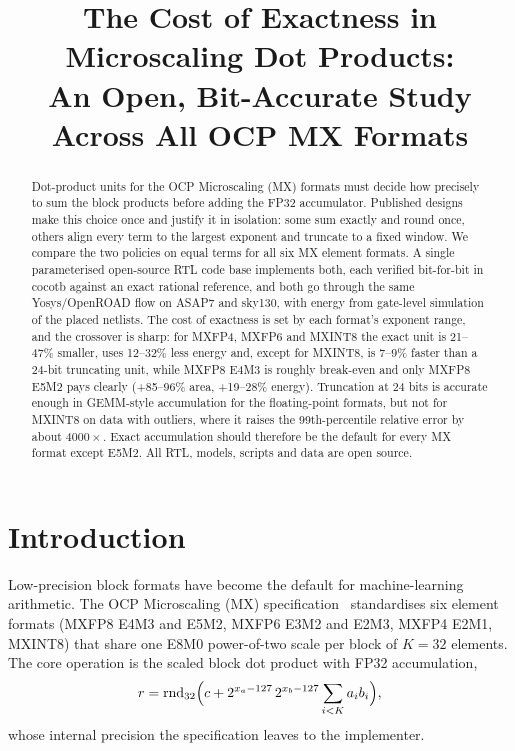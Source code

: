 \documentclass[conference,compsoc]{IEEEtran}
\begin{document}
\title{The Cost of Exactness in Microscaling Dot Products:\\
An Open, Bit-Accurate Study Across All OCP MX Formats}

\ifdefined\ANON
\author{
}
\else
\author{
}
\fi

\maketitle

\begin{abstract}
Dot-product units for the OCP Microscaling (MX) formats must decide how
precisely to sum the block products before adding the FP32 accumulator.
Published designs make this choice once and justify it in isolation: some
sum exactly and round once, others align every term to the largest exponent
and truncate to a fixed window.  We compare the two policies on equal terms
for all six MX element formats.  A single parameterised open-source RTL code
base implements both, each verified bit-for-bit in cocotb against an exact
rational reference, and both go through the same Yosys/OpenROAD flow on ASAP7
and sky130, with energy from gate-level simulation of the placed netlists.
The cost of exactness is set by each format's exponent range, and the
crossover is sharp: for MXFP4, MXFP6 and MXINT8 the exact unit is 21--47\%
smaller, uses 12--32\% less energy and, except for MXINT8, is 7--9\% faster
than a 24-bit truncating unit, while MXFP8 E4M3 is roughly break-even and
only MXFP8 E5M2 pays clearly (+85--96\% area, +19--28\% energy).  Truncation
at 24 bits is accurate enough in GEMM-style accumulation for the
floating-point formats, but not for MXINT8 on data with outliers, where it
raises the 99th-percentile relative error by about $4000\times$.  Exact
accumulation should therefore be the default for every MX format except
E5M2.  All RTL, models, scripts and data are open source.
\end{abstract}

\section{Introduction}
Low-precision block formats have become the default for machine-learning
arithmetic.  The OCP Microscaling (MX) specification~\cite{ocp_mx}
standardises six element formats (MXFP8 E4M3 and E5M2, MXFP6 E3M2 and E2M3,
MXFP4 E2M1, MXINT8) that share one E8M0 power-of-two scale per block of
$K=32$ elements.  The core operation is the scaled block dot product with
FP32 accumulation,
\begin{equation}
  r = \mathrm{rnd}_{32}\Bigl(c + 2^{x_a-127}\,2^{x_b-127}\sum_{i<K} a_i b_i\Bigr),
  \label{eq:dot}
\end{equation}
whose internal precision the specification leaves to the implementer.
\end{document}
